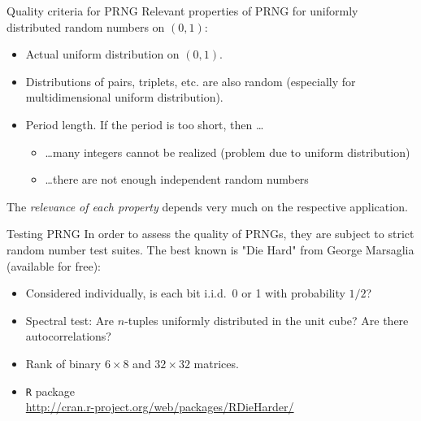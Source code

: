 \documentclass[11pt,compress,t,notes=noshow, xcolor=table]{beamer}
\begin{document}
\begin{vbframe}{Quality criteria for PRNG}
Relevant properties of PRNG for uniformly distributed random numbers on $(0, 1)$:
\begin{itemize}
\item Actual uniform distribution on $(0, 1)$.
\item Distributions of pairs, triplets, etc. are also random (especially for multidimensional
  uniform distribution).
\item Period length. If the period is too short, then \ldots
\begin{itemize}
\item \ldots many integers cannot be realized (problem due to uniform distribution)
\item \ldots there are not enough independent random numbers
\end{itemize}
\end{itemize}
The \emph{relevance of each property} depends very much on the respective
application.
\end{vbframe}

\begin{vbframe}{Testing PRNG}
In order to assess the quality of PRNGs, they are subject to strict random number test suites.
The best known is "Die Hard" from George
Marsaglia (available for free):
\begin{itemize}
 \item Considered individually, is each bit i.i.d.\ 0 or 1 with probability $1/2$?
 \item Spectral test: Are $n$-tuples uniformly distributed in the unit cube?
  Are there autocorrelations?
 \item Rank of binary $6\times 8$ and $32\times 32$ matrices.
 \item \texttt{R} package  \\
    \url{http://cran.r-project.org/web/packages/RDieHarder/}
\end{itemize}
\end{vbframe}


\endlecture
\end{document}
